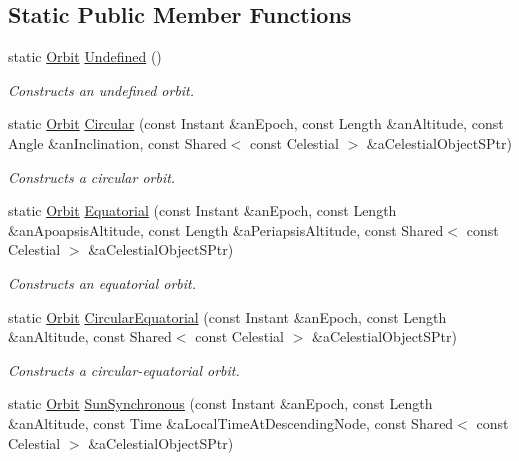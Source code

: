 \subsection*{Static Public Member Functions}
\begin{DoxyCompactItemize}
\item 
static \hyperlink{classostk_1_1astro_1_1trajectory_1_1_orbit}{Orbit} \hyperlink{classostk_1_1astro_1_1trajectory_1_1_orbit_a2b1bc936b69b8c70cd33a6b26c943f31}{Undefined} ()
\begin{DoxyCompactList}\small\item\em Constructs an undefined orbit. \end{DoxyCompactList}\item 
static \hyperlink{classostk_1_1astro_1_1trajectory_1_1_orbit}{Orbit} \hyperlink{classostk_1_1astro_1_1trajectory_1_1_orbit_aaf9d4274b72e4eb756212f7946edc237}{Circular} (const Instant \&an\+Epoch, const Length \&an\+Altitude, const Angle \&an\+Inclination, const Shared$<$ const Celestial $>$ \&a\+Celestial\+Object\+S\+Ptr)
\begin{DoxyCompactList}\small\item\em Constructs a circular orbit. \end{DoxyCompactList}\item 
static \hyperlink{classostk_1_1astro_1_1trajectory_1_1_orbit}{Orbit} \hyperlink{classostk_1_1astro_1_1trajectory_1_1_orbit_a88a5db265588461a9e756fd2aa4d3e4c}{Equatorial} (const Instant \&an\+Epoch, const Length \&an\+Apoapsis\+Altitude, const Length \&a\+Periapsis\+Altitude, const Shared$<$ const Celestial $>$ \&a\+Celestial\+Object\+S\+Ptr)
\begin{DoxyCompactList}\small\item\em Constructs an equatorial orbit. \end{DoxyCompactList}\item 
static \hyperlink{classostk_1_1astro_1_1trajectory_1_1_orbit}{Orbit} \hyperlink{classostk_1_1astro_1_1trajectory_1_1_orbit_a8070657a625af4dae7b79a23e5026dcd}{Circular\+Equatorial} (const Instant \&an\+Epoch, const Length \&an\+Altitude, const Shared$<$ const Celestial $>$ \&a\+Celestial\+Object\+S\+Ptr)
\begin{DoxyCompactList}\small\item\em Constructs a circular-\/equatorial orbit. \end{DoxyCompactList}\item 
static \hyperlink{classostk_1_1astro_1_1trajectory_1_1_orbit}{Orbit} \hyperlink{classostk_1_1astro_1_1trajectory_1_1_orbit_aaf0e7e3140ba78c06cc590f37ba680a5}{Sun\+Synchronous} (const Instant \&an\+Epoch, const Length \&an\+Altitude, const Time \&a\+Local\+Time\+At\+Descending\+Node, const Shared$<$ const Celestial $>$ \&a\+Celestial\+Object\+S\+Ptr)

\end{DoxyCompactItemize}
